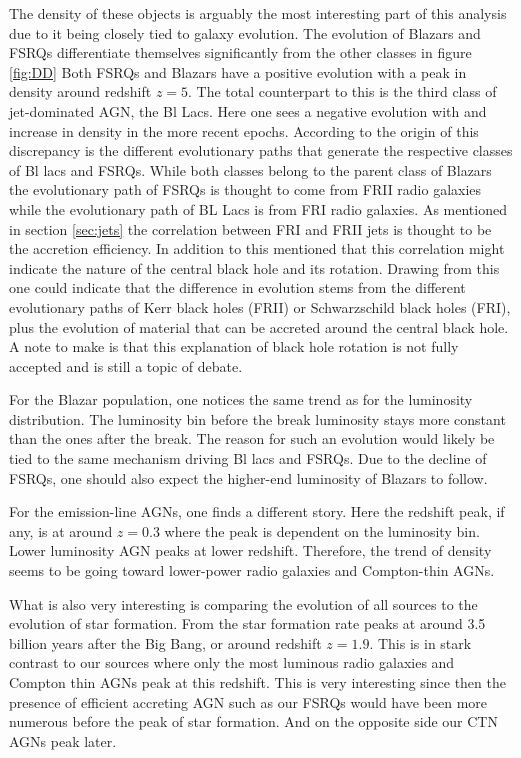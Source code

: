 The density of these objects is arguably the most interesting part of this analysis due to it being closely tied to galaxy evolution. The evolution of Blazars and FSRQs differentiate themselves significantly from the other classes in figure \ref*{fig:DD}
Both FSRQs and Blazars have a positive evolution with a peak in density around redshift $z=5$. The total counterpart to this is the third class of jet-dominated AGN, the Bl Lacs. Here one sees a negative evolution with 
and increase in density in the more recent epochs. According to \cite{Garofalo_2019} the origin of this discrepancy is the different evolutionary paths that generate the respective classes of Bl lacs and FSRQs. 
While both classes belong to the parent class of Blazars the evolutionary path of FSRQs is thought to come from FRII radio galaxies while the evolutionary path of BL Lacs is from FRI radio galaxies. As mentioned in section \ref*{sec:jets} the correlation between FRI and FRII jets is thought to be the accretion efficiency. 
In addition to this \cite{Wei-Hao_2003} mentioned that this correlation might indicate the nature of the central black hole and its rotation. Drawing from this one could indicate that the difference in evolution stems from the different evolutionary paths of Kerr black holes (FRII) or Schwarzschild black holes (FRI), plus the evolution of material that can be accreted around the central black hole.
A note to make is that this explanation of black hole rotation is not fully accepted and is still a topic of debate.



For the Blazar population, one notices the same trend as for the luminosity distribution. The luminosity bin before the break luminosity stays more constant than the ones after the break. The reason for such an evolution 
would likely be tied to the same mechanism driving Bl lacs and FSRQs. Due to the decline of FSRQs, one should also expect the
higher-end luminosity of Blazars to follow.

For the emission-line AGNs, one finds a different story. Here the redshift peak, if any, is at around $z=0.3$ where the peak is dependent on the luminosity bin. Lower luminosity AGN peaks at lower redshift. Therefore, the trend of density 
seems to be going toward lower-power radio galaxies and Compton-thin AGNs. 

What is also very interesting is comparing the evolution of all sources to 
the evolution of star formation. From \cite{Madau_2014} the star formation rate peaks at around 3.5 billion years after the Big Bang, 
or around redshift $z= 1.9$. This is in stark contrast to our sources where only the most luminous radio galaxies and Compton thin AGNs peak at this redshift. 
This is very interesting since then the presence of efficient accreting AGN such as our FSRQs would have been more numerous before the peak of star formation. 
And on the opposite side our CTN AGNs peak later. 


